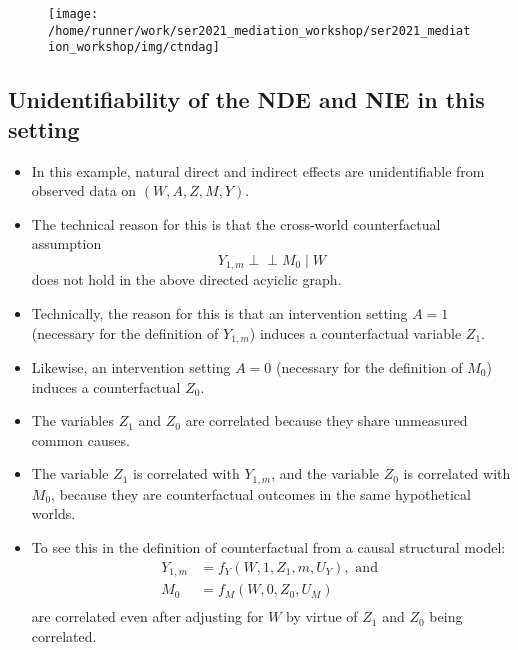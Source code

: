 \documentclass[
  12pt,
]{book}
\providecommand{\tightlist}{%
  \setlength{\itemsep}{0pt}\setlength{\parskip}{0pt}}
\theoremstyle{definition}
\theoremstyle{definition}
\theoremstyle{definition}
\newcommand{\indep}{\mbox{$\perp\!\!\!\perp$}}
\newcommand{\1}{\mathbbm{1}}
\begin{document}
\begin{figure}

{\centering \texttt{[image: /home/runner/work/ser2021\_mediation\_workshop/ser2021\_mediation\_workshop/img/ctndag]} 

}

\end{figure}

\hypertarget{unidentifiability-of-the-nde-and-nie-in-this-setting}{%
\subsection{Unidentifiability of the NDE and NIE in this setting}\label{unidentifiability-of-the-nde-and-nie-in-this-setting}}

\begin{itemize}
\tightlist
\item
  In this example, natural direct and indirect effects are
  unidentifiable from observed data on \((W,A,Z,M,Y)\).
\item
  The technical
  reason for this is that the cross-world counterfactual assumption
  \begin{equation*}
  Y_{1,m}\indep M_0\mid W
  \end{equation*}
  does not hold in the above directed acyiclic graph.
\item
  Technically, the
  reason for this is that an intervention setting \(A=1\) (necessary for
  the definition of \(Y_{1,m}\)) induces a counterfactual variable
  \(Z_1\).
\item
  Likewise, an intervention setting \(A=0\) (necessary for the
  definition of \(M_0\)) induces a counterfactual \(Z_0\).
\item
  The variables \(Z_1\) and \(Z_0\) are correlated because they share unmeasured common
  causes.
\item
  The variable \(Z_1\) is correlated with \(Y_{1,m}\), and the
  variable \(Z_0\) is correlated with \(M_0\), because they are
  counterfactual outcomes in the same hypothetical worlds.
\item
  To see this in the definition of counterfactual from a causal structural model:
  \begin{align*}
  Y_{1,m} &= f_Y(W, 1, Z_1, m, U_Y), \text{ and }\\
  M_0 &= f_M(W, 0, Z_0, U_M)\\
  \end{align*}
  are correlated even after adjusting for \(W\) by virtue of \(Z_1\) and \(Z_0\) being correlated.
\end{itemize}
\end{document}
